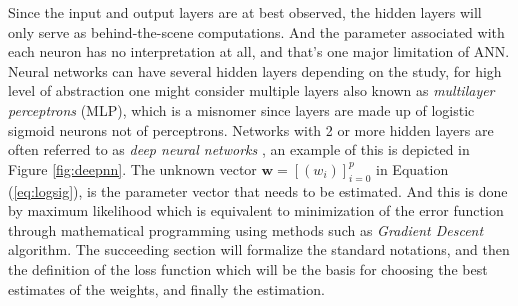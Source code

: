 Since the input and output layers are at best observed, the hidden layers will only serve as behind-the-scene computations. And the parameter associated with each neuron has no interpretation at all, and that's one major limitation of ANN. Neural networks can have several hidden layers depending on the study, for high level of abstraction one might consider multiple layers also known as \textit{multilayer perceptrons} (MLP), which is a misnomer since layers are made up of logistic sigmoid neurons not of perceptrons. Networks with 2 or more hidden layers are often referred to as \textit{deep neural networks} \cite{nndeepl}, an example of this is depicted in Figure \ref{fig:deepnn}. The unknown vector $\mathbf{w}=[(w_i)]_{i=0}^p$ in Equation (\ref{eq:logsig}), is the parameter vector that needs to be estimated. And this is done by maximum likelihood which is equivalent to minimization of the error function through mathematical programming using methods such as \textit{Gradient Descent} algorithm. The succeeding section will formalize the standard notations, and then the definition of the loss function which will be the basis for choosing the best estimates of the weights, and finally the estimation.

